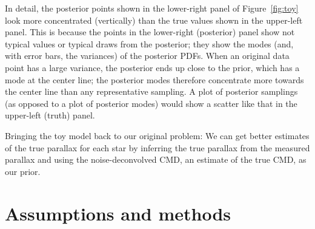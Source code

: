 \documentclass[modern]{aastex61}
\newcommand{\acronym}[1]{{\small{#1}}}
\newcommand{\cmd}{\acronym{CMD}}
\begin{document}
In detail, the posterior points shown in the lower-right panel of
Figure~\ref{fig:toy} look more concentrated (vertically) than the true
values shown in the upper-left panel.
This is because the points in the lower-right (posterior) panel show
not typical values or typical draws from the posterior; they show the
modes (and, with error bars, the variances) of the posterior PDFs.
When an original data point has a large variance, the posterior ends
up close to the prior, which has a mode at the center line; the
posterior modes therefore concentrate more towards the center line
than any representative sampling.
A plot of posterior samplings (as opposed to a plot of posterior modes) would
show a scatter like that in the upper-left (truth) panel.

Bringing the toy model back to our original problem:
We can get better estimates of the true parallax for each star by inferring the true parallax from the measured parallax and using the noise-deconvolved \cmd, an estimate of the true \cmd, as our prior.

\section{Assumptions and methods}\label{sec:method}
\end{document}

